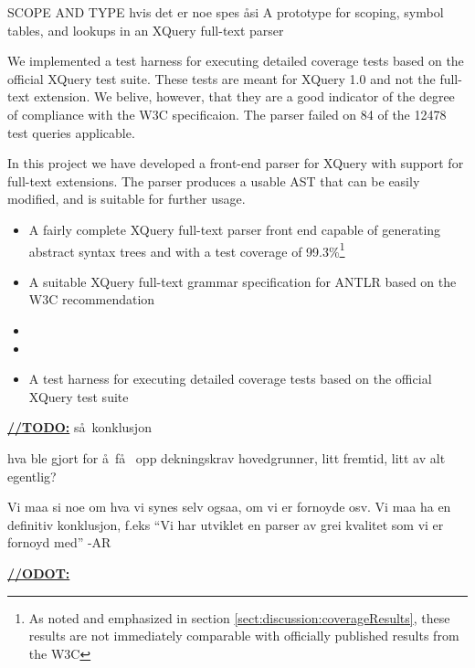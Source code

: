 SCOPE AND TYPE hvis det er noe spes \aa si \rightarrow A prototype for scoping, symbol tables, and lookups in an XQuery full-text parser

We implemented a test harness for executing detailed coverage tests based on the official XQuery test suite\cite{w3c05}. These tests are meant for XQuery 1.0 and not the full-text extension. We belive, however, that they are a good indicator of the degree of compliance with the W3C specificaion. The parser failed on 84 of the 12478 test queries applicable. 

In this project we have developed a front-end parser for XQuery with support for full-text extensions. The parser produces a usable AST that can be easily modified, and is suitable for further usage.




\begin{itemize}
  \item A fairly complete XQuery full-text parser front end capable of
  generating abstract syntax trees and with a test coverage of
  99.3\%\footnote{As noted and emphasized in section
  \ref{sect:discussion:coverageResults},
  these results are not immediately comparable with officially published results
  from the W3C}


  \item A suitable XQuery full-text grammar specification for ANTLR based on the
  W3C recommendation

  \item 
  \item 

  \item A test harness for executing detailed coverage tests based on the
  official XQuery test suite
\end{itemize}


\underline{\textbf{\LARGE //TODO:}}
s\aa~konklusjon


hva ble gjort for \aa ~f\aa~ opp dekningskrav hovedgrunner, litt fremtid, litt
av alt egentlig? 

Vi maa si noe om hva vi synes selv ogsaa, om vi er fornoyde osv. Vi maa ha en
definitiv konklusjon, f.eks ``Vi har utviklet en parser av grei kvalitet som vi
er fornoyd med'' 
-AR

\underline{\textbf{\LARGE //ODOT:}}